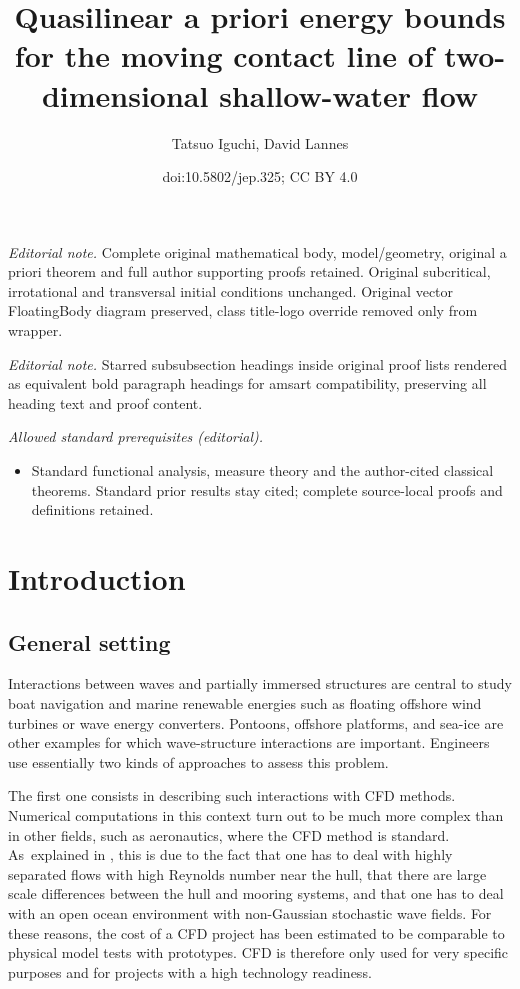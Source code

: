 \documentclass[10pt]{amsart}
\title{Quasilinear a priori energy bounds for the moving contact line of two-dimensional shallow-water flow}
\author{Tatsuo Iguchi, David Lannes}
\date{doi:10.5802/jep.325; CC BY 4.0}
\theoremstyle{definition}
\begin{document}
\maketitle
\noindent\textit{Editorial note.} Complete original mathematical body, model/geometry, original a priori theorem and full author supporting proofs retained. Original subcritical, irrotational and transversal initial conditions unchanged. Original vector FloatingBody diagram preserved, class title-logo override removed only from wrapper.\par\medskip
\noindent\textit{Editorial note.} Starred subsubsection headings inside original proof lists rendered as equivalent bold paragraph headings for amsart compatibility, preserving all heading text and proof content.\par\medskip
\noindent\textit{Allowed standard prerequisites (editorial).}\begin{itemize}
\item Standard functional analysis, measure theory and the author-cited classical theorems. Standard prior results stay cited; complete source-local proofs and definitions retained.
\end{itemize}\medskip
\vspace*{-\baselineskip}
\tableofcontents


\section{Introduction}
\subsection{General setting}
Interactions between waves and partially immersed structures are central to study boat navigation and marine renewable energies
such as floating offshore wind turbines or wave energy converters.
Pontoons, offshore platforms, and sea-ice are other examples for which wave-structure interactions are important.
Engineers use essentially two kinds of approaches to assess this problem.

The first one consists in describing such interactions with CFD methods.
Numerical computations in this context turn out to be much more complex than in other fields, such as aeronautics, where the CFD method is standard. As~explained in \cite{Kim}, this is due to the fact that one has to deal with highly separated flows with high Reynolds number near the hull,
that there are large scale differences between the hull and mooring systems,
and that one has to deal with an open ocean environment with non-Gaussian stochastic wave fields.
For these reasons, the cost of a CFD project has been estimated to be comparable to physical model tests with prototypes.
CFD is therefore only used for very specific purposes and for projects with a high technology readiness.
\end{document}
